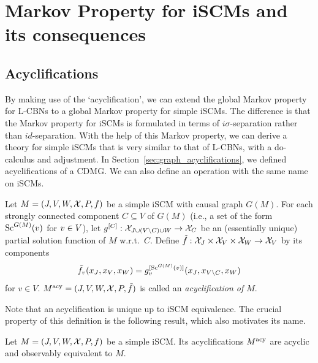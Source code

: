\newpage
\section{Markov Property for iSCMs and its consequences}

\subsection{Acyclifications}

By making use of the `acyclification', we can extend the global Markov property for L-CBNs to a global Markov property for simple iSCMs.
The difference is that the Markov property for iSCMs is formulated in terms of $i\sigma$-separation rather than $id$-separation.
With the help of this Markov property, we can derive a theory for simple iSCMs that is very similar to that of L-CBNs, with a do-calculus and adjustment.
In Section~\ref{sec:graph_acyclifications}, we defined acyclifications of a CDMG.
We can also define an operation with the same name on iSCMs.
\begin{Def}\label{def:scm_acyclification}
  Let $M = \left ( J, V, W, \mathcal{X}, P, f \right )$ be a simple iSCM with causal graph $G(M)$.
  For each strongly connected component $C \subseteq V$ of $G(M)$ (i.e., a set of the form
  $\mathrm{Sc}^{G(M)}(v)$ for $v \in V$), let 
  $g^{[C]} : \mathcal{X}_{J \cup (V \setminus C) \cup W} \to \mathcal{X}_C$
  be an (essentially unique) partial solution function of $M$ w.r.t.\ $C$.
  Define $\tilde{f} : \mathcal{X}_{J} \times \mathcal{X}_{V} \times \mathcal{X}_{W} \to \mathcal{X}_{V}$ by its components
  $$\tilde{f}_v(x_{J},x_{V},x_{W}) = g^{[\mathrm{Sc}^{G(M)}(v)]}_v(x_{J},x_{V\setminus C},x_{W})$$
  for $v \in V$.
  $M^{\mathrm{acy}} = ( J, V, W, \mathcal{X}, P, \tilde{f} )$ is called an
  \emph{acyclification of $M$}.
\end{Def}
Note that an acyclification is unique up to iSCM equivalence.
The crucial property of this definition is the following result, which also motivates its name.
\begin{Prp}\label{prp:scm_acyclification_properties}
  Let $M = \left ( J, V, W, \mathcal{X}, P, f \right )$ be a simple iSCM. Its acyclifications $M^{\mathrm{acy}}$ are
  acyclic and observably equivalent to $M$.
\end{Prp}
